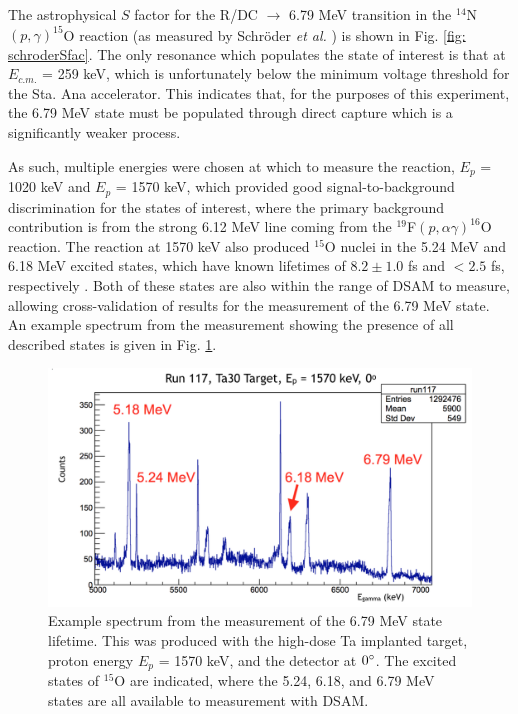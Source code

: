 The astrophysical $S$ factor for the R/DC $\rightarrow$ 6.79 MeV transition in the $^{14}$N$\left( p,\gamma \right) ^{15}$O reaction (as measured by Schr{\"o}der \textit{et al.} \cite{Schroder1987}) is shown in Fig. \ref{fig: schroderSfac}. The only resonance which populates the state of interest is that at  $E_{c.m.}$ = 259 keV, which is unfortunately below the minimum voltage threshold for the Sta. Ana accelerator. This indicates that, for the purposes of this experiment, the 6.79 MeV state must be populated through direct capture which is a significantly weaker process. 

As such, multiple energies were chosen at which to measure the reaction, $E_{p}$ = 1020 keV and $E_{p}$ = 1570 keV, which provided good signal-to-background discrimination for the states of interest, where the primary background contribution is from the strong 6.12 MeV line coming from the $^{19}$F$\left( p, \alpha\gamma \right)^{16}$O reaction. The reaction at 1570 keV also produced $^{15}$O nuclei in the 5.24 MeV and 6.18 MeV excited states, which have known lifetimes of $8.2 \pm 1.0$ fs and $< 2.5$ fs, respectively \cite{Ajzenberg-Selove1991}. Both of these states are also within the range of DSAM to measure, allowing cross-validation of results for the measurement of the 6.79 MeV state. An example spectrum from the measurement showing the presence of all described states is given in Fig. \ref{fig: lifetimeSpec}.


\begin{figure}
\includegraphics[width=\linewidth]{figures/lifetimeSpectrum.png}
\caption{Example spectrum from the measurement of the 6.79 MeV state lifetime. This was produced with the high-dose Ta implanted target, proton energy $E_{p}$ = 1570 keV, and the detector at $0\degree$. The excited states of $^{15}$O are indicated, where the 5.24, 6.18, and 6.79 MeV states are all available to measurement with DSAM.  }
\label{fig: lifetimeSpec}
\end{figure}

